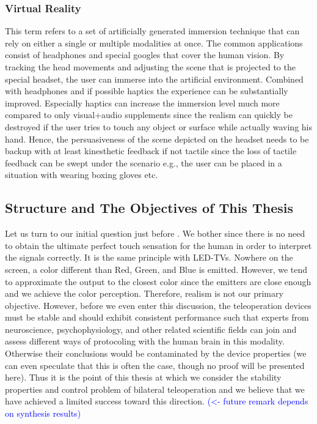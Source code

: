 \subsubsection{Virtual Reality}

This term refers to a set of artificially generated immersion technique that can rely on either a single or multiple modalities at once. The common applications consist of headphones and special googles that cover the human vision. By tracking the head movements and adjusting the scene that is projected to the special headset, the user can immerse into the artificial environment. Combined with headphones and if possible haptics the experience can be substantially improved. Especially haptics can increase the immersion level much more compared to only visual+audio supplements since the realism can quickly be destroyed if the user tries to touch any object or surface while actually waving his hand. Hence, the persuasiveness of the scene depicted on the headset needs to be backup with at least kinesthetic feedback if not tactile since the loss of tactile feedback can be swept under the scenario e.g., the user can be placed in a situation with wearing boxing gloves etc. 



\subsection{Structure and The Objectives  of This Thesis}
Let us turn to our initial question just before . We bother since there is no need to obtain the ultimate perfect touch sensation for the human in order to interpret the signals correctly. It is the same principle with LED-TVs. Nowhere on the screen, a color different than Red, Green, and Blue is emitted. However, we tend to approximate the output to the closest color since the emitters are close enough and we achieve the color perception. Therefore, realism is not our primary objective. However, before we even enter this discussion, the teleoperation devices must be stable and should exhibit consistent performance such that experts from neuroscience, psychophysiology, and other related scientific fields can join and assess different ways of protocoling with the human brain in this modality. Otherwise their conclusions would be contaminated by the device properties (we can even speculate that this is often the case, though no proof will be presented here). Thus it is the point of this thesis at which we consider the stability properties and control problem of bilateral teleoperation and we believe that we have achieved a limited success toward this direction. \textcolor{blue}{(<- future remark depends on synthesis results)}


